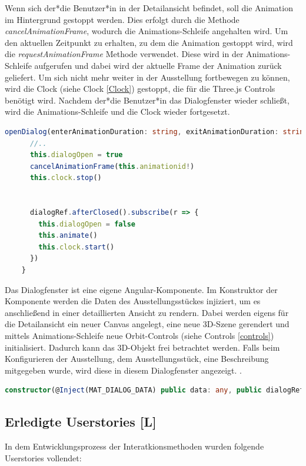 Wenn sich der*die Benutzer*in in der Detailansicht befindet, soll die Animation im Hintergrund gestoppt werden. Dies erfolgt durch die Methode \emph{cancelAnimationFrame}, wodurch die Animations-Schleife angehalten wird. Um den aktuellen Zeitpunkt zu erhalten, zu dem die Animation gestoppt wird, wird die \emph{requestAnimationFrame} Methode verwendet. Diese wird in der Animations-Schleife aufgerufen und dabei wird der aktuelle Frame der Animation zurück geliefert. Um sich nicht mehr weiter in der Ausstellung fortbewegen zu können, wird die Clock (siehe Clock \ref{Clock}) gestoppt, die für die Three.js Controls benötigt wird. Nachdem der*die Benutzer*in das Dialogfenster wieder schließt, wird die Animations-Schleife und die Clock wieder fortgesetzt. 

\begin{lstlisting}[caption={Öffnen und Schließen des Dialogfensters},language=TypeScript]
  openDialog(enterAnimationDuration: string, exitAnimationDuration: string): void {
      //..
      this.dialogOpen = true
      cancelAnimationFrame(this.animationid!)
      this.clock.stop()
  
  
      dialogRef.afterClosed().subscribe(r => {
        this.dialogOpen = false
        this.animate()
        this.clock.start()
      })
    }
\end{lstlisting}

Das Dialogfenster ist eine eigene Angular-Komponente. Im Konstruktor der Komponente werden die Daten des Ausstellungsstückes injiziert, um es anschließend in einer detaillierten Ansicht zu rendern. Dabei werden eigens für die Detailansicht ein neuer Canvas angelegt, eine neue 3D-Szene gerendert und mittels Animations-Schleife neue Orbit-Controls (siehe Controls \ref{controls}) initialisiert. Dadurch kann das 3D-Objekt frei betrachtet werden. Falls beim Konfigurieren der Ausstellung, dem Ausstellungsstück, eine Beschreibung mitgegeben wurde, wird diese in diesem Dialogfenster angezeigt. .

  \begin{lstlisting}[caption={Constructor-Injection in der Dialog Komponente},language=TypeScript]
    constructor(@Inject(MAT_DIALOG_DATA) public data: any, public dialogRef: MatDialogRef<ExhibitDialog>) {}

  \end{lstlisting}
  
\subsection{Erledigte Userstories [L]}
In dem Entwicklungsprozess der Interatkionsmethoden wurden folgende Userstories vollendet:

